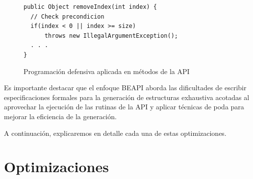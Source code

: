 \begin{figure}[!thb]
\begin{lstlisting}
public Object removeIndex(int index) {
  // Check precondicion
  if(index < 0 || index >= size)
      throws new IllegalArgumentException();  
  . . .
}

\end{lstlisting}
\caption{Programación defensiva aplicada en métodos de la API}
\label{fig:algoProgDefensiva}
\end{figure}


Es importante destacar que el enfoque \textsf{BEAPI} aborda las dificultades de escribir especificaciones formales para la generación de estructuras exhaustiva acotadas al aprovechar la ejecución de las rutinas de la API y aplicar técnicas de poda para mejorar la eficiencia de la generación.





A continuación, explicaremos en detalle cada una de estas optimizaciones.


\section{Optimizaciones}
